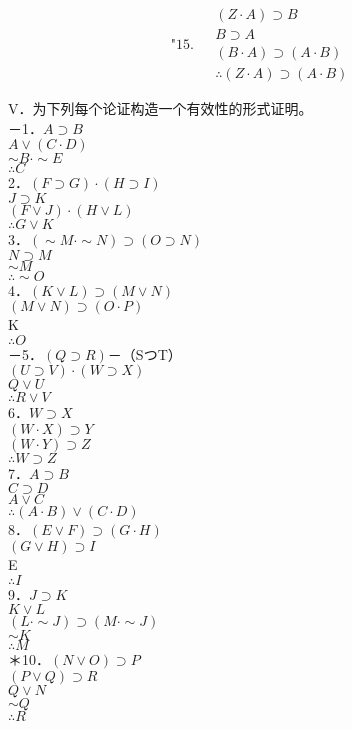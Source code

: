 $$
\text { "15. } \begin{aligned}
& (Z \cdot A) \supset B \\
& B \supset A \\
& (B \cdot A) \supset(A \cdot B) \\
& \therefore(Z \cdot A) \supset(A \cdot B)
\end{aligned}
$$

V．为下列每个论证构造一个有效性的形式证明。\\
－1．$A \supset B$\\
$A \vee(C \cdot D)$\\
$\sim B \cdot \sim E$\\
$\therefore C$\\
2．$(F \supset G) \cdot(H \supset I)$\\
$J \supset K$\\
$(F \vee J) \cdot(H \vee L)$\\
$\therefore G \vee K$\\
3．$(\sim M \cdot \sim N) \supset(O \supset N)$\\
$N \supset M$\\
$\sim M$\\
$\therefore \sim O$\\
4．$(K \vee L) \supset(M \vee N)$\\
$(M \vee N) \supset(O \cdot P)$\\
K\\
$\therefore O$\\
－5．$(Q \supset R)$－（SつT）\\
$(U \supset V) \cdot(W \supset X)$\\
$Q \vee U$\\
$\therefore R \vee V$\\
6．$W \supset X$\\
$(W \cdot X) \supset Y$\\
$(W \cdot Y) \supset Z$\\
$\therefore W \supset Z$\\
7．$A \supset B$\\
$C \supset D$\\
$A \vee C$\\
$\therefore(A \cdot B) \vee(C \cdot D)$\\
8．$(E \vee F) \supset(G \cdot H)$\\
$(G \vee H) \supset I$\\
E\\
$\therefore I$\\
9．$J \supset K$\\
$K \vee L$\\
$(L \cdot \sim J) \supset(M \cdot \sim J)$\\
$\sim K$\\
$\therefore M$\\
＊10．$(N \vee O) \supset P$\\
$(P \vee Q) \supset R$\\
$Q \vee N$\\
$\sim Q$\\
$\therefore R$

